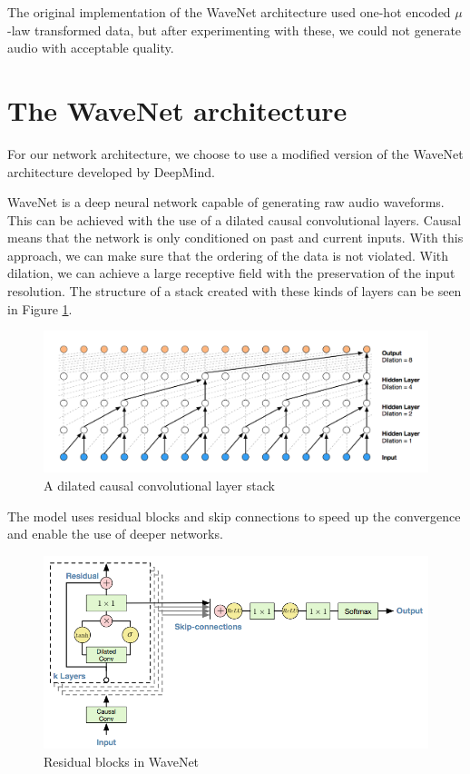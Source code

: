 \documentclass{article}
\begin{document}
	The original implementation of the WaveNet architecture used one-hot encoded $\mu$-law transformed data, but after experimenting with these, we could not generate audio with acceptable quality.


	\section{The WaveNet architecture}
	\label{sec:wavenet}
	For our network architecture, we choose to use a modified version of the WaveNet\cite{wavenet} architecture developed by DeepMind.

	WaveNet is a deep neural network capable of generating raw audio waveforms. This can be achieved with the use of a dilated causal convolutional layers. Causal means that the network is only conditioned on past and current inputs. With this approach, we can make sure that the ordering of the data is not violated. With dilation, we can achieve a large receptive field with the preservation of the input resolution. The structure of a stack created with these kinds of layers can be seen in Figure \ref{fig:dccs}.
	
		
	\begin{figure}[H]
		\centering
		\includegraphics[width=.8\linewidth]{dccs.png}
		\caption{A dilated causal convolutional layer stack}
		\label{fig:dccs}
	\end{figure}
	
	The model uses residual blocks and skip connections to speed up the convergence and enable the use of deeper networks.
	
	\begin{figure}[H]
		\centering
		\includegraphics[width=.8\linewidth]{residual.png}
		\caption{Residual blocks in WaveNet}
		\label{fig:residual}
	\end{figure}
\end{document}
